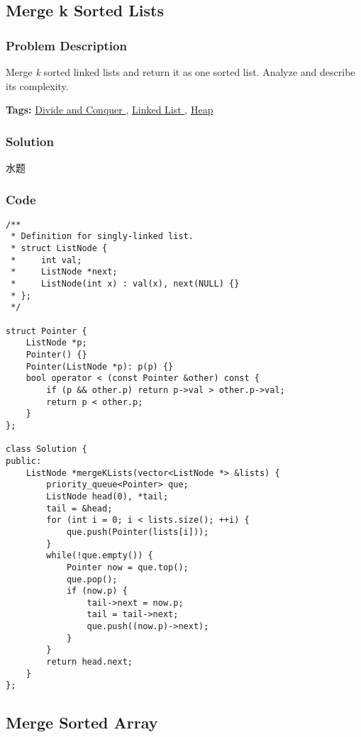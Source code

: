 \documentclass{article}
\begin{document}
\begin{CJK*}{UTF8}{gkai}
\subsection{ Merge k Sorted Lists }
\label{ Merge k Sorted Lists }

\subsubsection*{Problem Description}
Merge \emph{k} sorted linked lists and return it as one sorted list. Analyze and describe its complexity.


\textbf{Tags: }
\hyperref[ Divide and Conquer ]{ Divide and Conquer },  \hyperref[ Linked List ]{ Linked List },  \hyperref[ Heap ]{ Heap }



\subsubsection*{Solution}
水题

\subsubsection*{Code}
\begin{lstlisting}
/**
 * Definition for singly-linked list.
 * struct ListNode {
 *     int val;
 *     ListNode *next;
 *     ListNode(int x) : val(x), next(NULL) {}
 * };
 */
 
struct Pointer {
    ListNode *p;
    Pointer() {}
    Pointer(ListNode *p): p(p) {} 
    bool operator < (const Pointer &other) const {
        if (p && other.p) return p->val > other.p->val;
        return p < other.p;
    }
};

class Solution {
public:
    ListNode *mergeKLists(vector<ListNode *> &lists) {
        priority_queue<Pointer> que;
        ListNode head(0), *tail;
        tail = &head;
        for (int i = 0; i < lists.size(); ++i) {
            que.push(Pointer(lists[i]));
        }
        while(!que.empty()) {
            Pointer now = que.top();
            que.pop();
            if (now.p) {
                tail->next = now.p;
                tail = tail->next;
                que.push((now.p)->next);
            }
        }
        return head.next;
    }
}; 
\end{lstlisting}


\subsection{ Merge Sorted Array }
\label{ Merge Sorted Array }


\end{CJK*}
\end{document}
